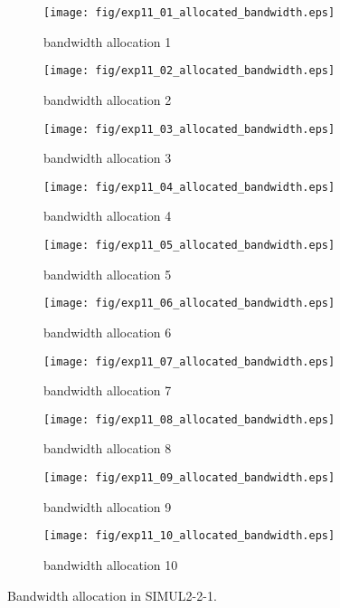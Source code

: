 	\begin{figure}
		\begin{center}
			\begin{subfigure}[b]{0.32\textwidth}
				\texttt{[image: fig/exp11\_01\_allocated\_bandwidth.eps]}
				\caption{bandwidth allocation 1}
				\label{figure:simul2_2_1_b_a}
			\end{subfigure}
			\begin{subfigure}[b]{0.32\textwidth}
				\texttt{[image: fig/exp11\_02\_allocated\_bandwidth.eps]}
				\caption{bandwidth allocation 2}
				\label{figure:simul2_2_1_b_b}
			\end{subfigure}
			\begin{subfigure}[b]{0.32\textwidth}
				\texttt{[image: fig/exp11\_03\_allocated\_bandwidth.eps]}
				\caption{bandwidth allocation 3}
				\label{figure:simul2_2_1_b_c}
			\end{subfigure}
			\begin{subfigure}[b]{0.32\textwidth}
				\texttt{[image: fig/exp11\_04\_allocated\_bandwidth.eps]}
				\caption{bandwidth allocation 4}
				\label{figure:simul2_2_1_b_d}
			\end{subfigure}
			\begin{subfigure}[b]{0.32\textwidth}
				\texttt{[image: fig/exp11\_05\_allocated\_bandwidth.eps]}
				\caption{bandwidth allocation 5}
				\label{figure:simul2_2_1_b_e}
			\end{subfigure}
			\begin{subfigure}[b]{0.32\textwidth}
				\texttt{[image: fig/exp11\_06\_allocated\_bandwidth.eps]}
				\caption{bandwidth allocation 6}
				\label{figure:simul2_2_1_b_f}
			\end{subfigure}
			\begin{subfigure}[b]{0.32\textwidth}
				\texttt{[image: fig/exp11\_07\_allocated\_bandwidth.eps]}
				\caption{bandwidth allocation 7}
				\label{figure:simul2_2_1_b_g}
			\end{subfigure}
			\begin{subfigure}[b]{0.32\textwidth}
				\texttt{[image: fig/exp11\_08\_allocated\_bandwidth.eps]}
				\caption{bandwidth allocation 8}
				\label{figure:simul2_2_1_b_h}
			\end{subfigure}
			\begin{subfigure}[b]{0.32\textwidth}
				\texttt{[image: fig/exp11\_09\_allocated\_bandwidth.eps]}
				\caption{bandwidth allocation 9}
				\label{figure:simul2_2_1_b_i}
			\end{subfigure}
			\begin{subfigure}[b]{0.32\textwidth}
				\texttt{[image: fig/exp11\_10\_allocated\_bandwidth.eps]}
				\caption{bandwidth allocation 10}
				\label{figure:simul2_2_1_b_j}
			\end{subfigure}
			\caption{Bandwidth allocation in SIMUL2-2-1.}
			\label{figure:simul2_2_1_ba}
		\end{center}
	\end{figure}


